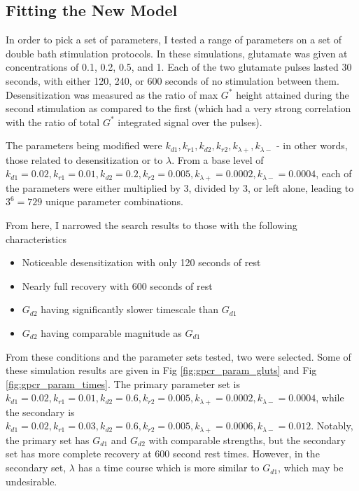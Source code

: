 \documentclass[12pt]{article}
\begin{document}
\subsection{Fitting the New Model}

In order to pick a set of parameters, I tested a range of parameters on a set of double bath stimulation protocols. In these simulations, glutamate was given at concentrations of 0.1, 0.2, 0.5, and 1. Each of the two glutamate pulses lasted 30 seconds, with either 120, 240, or 600 seconds of no stimulation between them. Desensitization was measured as the ratio of max $G^*$ height attained during the second stimulation as compared to the first (which had a very strong correlation with the ratio of total $G^*$ integrated signal over the pulses). 

The parameters being modified were $k_{d1}, k_{r1}, k_{d2}, k_{r2}, k_{\lambda+}, k_{\lambda-}$ - in other words, those related to desensitization or to $\lambda$. From a base level of $k_{d1}=0.02, k_{r1}=0.01, k_{d2}=0.2, k_{r2}=0.005, k_{\lambda+}=0.0002, k_{\lambda-}=0.0004$, each of the parameters were either multiplied by 3, divided by 3, or left alone, leading to $3^6=729$ unique parameter combinations.

From here, I narrowed the search results to those with the following characteristics
\begin{itemize}
\item Noticeable desensitization with only 120 seconds of rest
\item Nearly full recovery with 600 seconds of rest
\item $G_{d2}$ having significantly slower timescale than $G_{d1}$
\item $G_{d2}$ having comparable magnitude as $G_{d1}$
\end{itemize}

From these conditions and the parameter sets tested, two were selected. Some of these simulation results are given in Fig \ref{fig:gpcr_param_gluts} and Fig \ref{fig:gpcr_param_times}. The primary parameter set is $k_{d1}=0.02, k_{r1}=0.01, k_{d2}=0.6, k_{r2}=0.005, k_{\lambda+}=0.0002, k_{\lambda-}=0.0004$, while the secondary is $k_{d1}=0.02, k_{r1}=0.03, k_{d2}=0.6, k_{r2}=0.005, k_{\lambda+}=0.0006, k_{\lambda-}=0.012$. Notably, the primary set has $G_{d1}$ and $G_{d2}$ with comparable strengths, but the secondary set has more complete recovery at 600 second rest times. However, in the secondary set, $\lambda$ has a time course which is more similar to $G_{d1}$, which may be undesirable.
\end{document}
